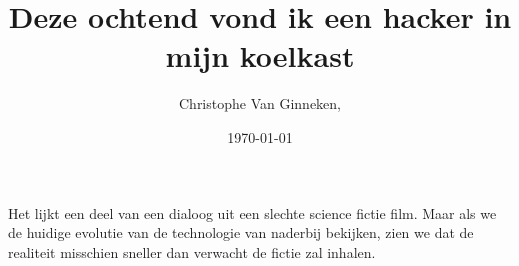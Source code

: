\documentclass[DIV=calc,paper=a4,fontsize=11pt,twocolumn,draft]{scrartcl}
\title{Deze ochtend vond ik een hacker in mijn koelkast}
\author{Christophe Van Ginneken, }
\date{\today}
\newcommand{\initial}[1]{
\lettrine[lines=3,lhang=0.3,nindent=0em]{
\color{DarkGoldenrod}
{\textsf{#1}}}{}}
\begin{document}
\maketitle
\thispagestyle{fancy}

\initial{H}et lijkt een deel van een dialoog uit een slechte science fictie
film. Maar als we de huidige evolutie van de technologie van naderbij bekijken,
zien we dat de realiteit misschien sneller dan verwacht de fictie zal inhalen.



\lipsum[1-10]
\end{document}
